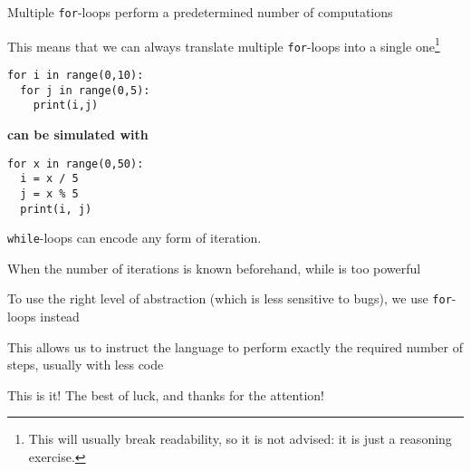 \documentclass{beamer}
\begin{document}
\begin{slide}{
\item Multiple \texttt{for}-loops perform a predetermined number of computations
\item This means that we can always translate multiple \texttt{for}-loops into a single one\footnote{This will usually break readability, so it is not advised: it is just a reasoning exercise.}
}\end{slide}

\begin{frame}[fragile]
\begin{lstlisting}
for i in range(0,10):
  for j in range(0,5):
    print(i,j)
\end{lstlisting}

\textbf{can be simulated with}

\begin{lstlisting}
for x in range(0,50):
  i = x / 5
  j = x % 5
  print(i, j)
\end{lstlisting}
\end{frame}


\begin{slide}{
\item \texttt{while}-loops can encode any form of iteration.
\item When the number of iterations is known beforehand, while is too powerful
\item To use the right level of abstraction (which is less sensitive to bugs), we use \texttt{for}-loops instead
\item This allows us to instruct the language to perform exactly the required number of steps, usually with less code
}\end{slide}

\begin{frame}{This is it!}
\center
\fontsize{18pt}{7.2}\selectfont
The best of luck, and thanks for the attention!
\end{frame}
\end{document}
